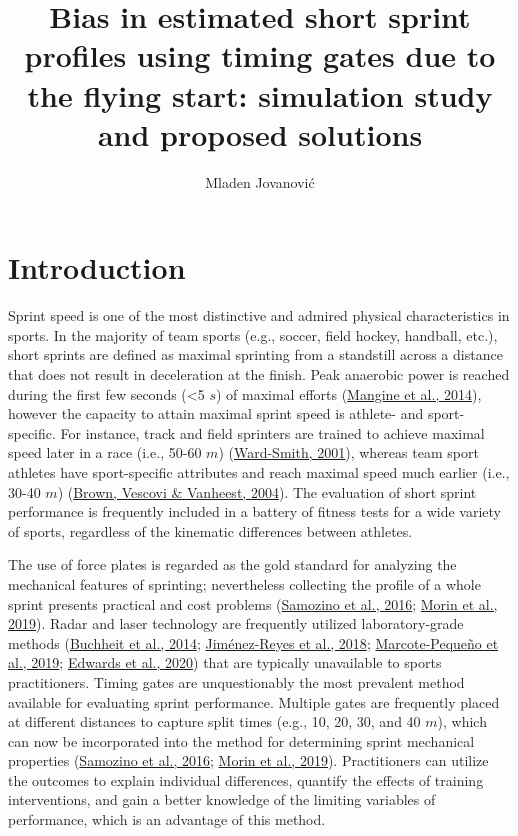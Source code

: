 \documentclass[fleqn,10pt]{wlpeerj} %
\title{Bias in estimated short sprint profiles using timing gates due to the flying start: simulation study and proposed solutions}
\author[1]{Mladen Jovanović}
\affil[1]{Faculty of Sport and Physical Education, University of Belgrade, Serbia}
\begin{document}
\flushbottom
\maketitle
\thispagestyle{empty}

\hypertarget{introduction}{%
\section{Introduction}\label{introduction}}

Sprint speed is one of the most distinctive and admired physical characteristics in sports. In the majority of team sports (e.g., soccer, field hockey, handball, etc.), short sprints are defined as maximal sprinting from a standstill across a distance that does not result in deceleration at the finish. Peak anaerobic power is reached during the first few seconds (\textless5 \(s\)) of maximal efforts (\protect\hyperlink{ref-mangineSpeedForcePower2014}{Mangine et al., 2014}), however the capacity to attain maximal sprint speed is athlete- and sport-specific. For instance, track and field sprinters are trained to achieve maximal speed later in a race (i.e., 50-60 \(m\)) (\protect\hyperlink{ref-ward-smithEnergyConversionStrategies2001}{Ward-Smith, 2001}), whereas team sport athletes have sport-specific attributes and reach maximal speed much earlier (i.e., 30-40 \(m\)) (\protect\hyperlink{ref-brownAssessmentLinearSprinting2004}{Brown, Vescovi \& Vanheest, 2004}). The evaluation of short sprint performance is frequently included in a battery of fitness tests for a wide variety of sports, regardless of the kinematic differences between athletes.

The use of force plates is regarded as the gold standard for analyzing the mechanical features of sprinting; nevertheless collecting the profile of a whole sprint presents practical and cost problems (\protect\hyperlink{ref-samozinoSimpleMethodMeasuring2016}{Samozino et al., 2016}; \protect\hyperlink{ref-morinSimpleMethodComputing2019}{Morin et al., 2019}). Radar and laser technology are frequently utilized laboratory-grade methods (\protect\hyperlink{ref-buchheitMechanicalDeterminantsAcceleration2014}{Buchheit et al., 2014}; \protect\hyperlink{ref-jimenez-reyesRelationshipVerticalHorizontal2018}{Jiménez-Reyes et al., 2018}; \protect\hyperlink{ref-marcote-pequenoAssociationForceVelocity2019}{Marcote-Pequeño et al., 2019}; \protect\hyperlink{ref-edwardsSprintAccelerationCharacteristics2020}{Edwards et al., 2020}) that are typically unavailable to sports practitioners. Timing gates are unquestionably the most prevalent method available for evaluating sprint performance. Multiple gates are frequently placed at different distances to capture split times (e.g., 10, 20, 30, and 40 \(m\)), which can now be incorporated into the method for determining sprint mechanical properties (\protect\hyperlink{ref-samozinoSimpleMethodMeasuring2016}{Samozino et al., 2016}; \protect\hyperlink{ref-morinSimpleMethodComputing2019}{Morin et al., 2019}). Practitioners can utilize the outcomes to explain individual differences, quantify the effects of training interventions, and gain a better knowledge of the limiting variables of performance, which is an advantage of this method.
\end{document}
